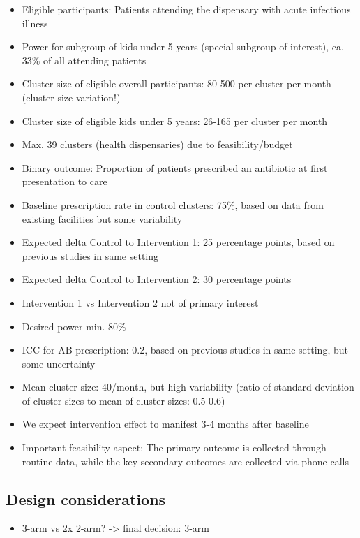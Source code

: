 \documentclass[
  letterpaper,
  DIV=11,
  numbers=noendperiod]{scrartcl}
\providecommand{\tightlist}{%
  \setlength{\itemsep}{0pt}\setlength{\parskip}{0pt}}\usepackage{longtable,booktabs,array}
\begin{document}
\begin{itemize}
\item
  Eligible participants: Patients attending the dispensary with acute
  infectious illness
\item
  Power for subgroup of kids under 5 years (special subgroup of
  interest), ca. 33\% of all attending patients
\item
  Cluster size of eligible overall participants: 80-500 per cluster per
  month (cluster size variation!)
\item
  Cluster size of eligible kids under 5 years: 26-165 per cluster per
  month
\item
  Max. 39 clusters (health dispensaries) due to feasibility/budget
\item
  Binary outcome: Proportion of patients prescribed an antibiotic at
  first presentation to care
\item
  Baseline prescription rate in control clusters: 75\%, based on data
  from existing facilities but some variability
\item
  Expected delta Control to Intervention 1: 25 percentage points, based
  on previous studies in same setting
\item
  Expected delta Control to Intervention 2: 30 percentage points
\item
  Intervention 1 vs Intervention 2 not of primary interest
\item
  Desired power min. 80\%
\item
  ICC for AB prescription: 0.2, based on previous studies in same
  setting, but some uncertainty
\item
  Mean cluster size: 40/month, but high variability (ratio of standard
  deviation of cluster sizes to mean of cluster sizes: 0.5-0.6)
\item
  We expect intervention effect to manifest 3-4 months after baseline
\item
  Important feasibility aspect: The primary outcome is collected through
  routine data, while the key secondary outcomes are collected via phone
  calls
\end{itemize}

\subsection{Design considerations}\label{design-considerations}

\begin{itemize}
\tightlist
\item
  3-arm vs 2x 2-arm? -\textgreater{} final decision: 3-arm
\end{itemize}
\end{document}

